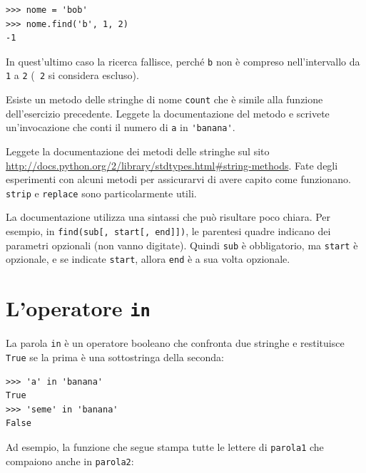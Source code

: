 \documentclass[10pt]{book}
\begin{document}
\begin{verbatim}
>>> nome = 'bob'
>>> nome.find('b', 1, 2)
-1
\end{verbatim}
%
In quest'ultimo caso la ricerca fallisce, perché {\tt b} non è compreso nell'intervallo da {\tt 1} a {\tt 2} ({\tt
2} si considera escluso).

\vspace{0.2in}
\begin{exercise}

Esiste un metodo delle stringhe di nome {\tt count} che è simile alla funzione dell'esercizio precedente. Leggete la documentazione del metodo e scrivete un'invocazione che conti il numero di {\tt a} in \verb"'banana'".
\end{exercise}

\vspace{0.2in}
\begin{exercise}

Leggete la documentazione dei metodi delle stringhe sul sito
\url{http://docs.python.org/2/library/stdtypes.html#string-methods}.
Fate degli esperimenti con alcuni metodi per assicurarvi di avere capito come funzionano. {\tt strip} e {\tt replace} sono particolarmente utili.

La documentazione utilizza una sintassi che può risultare poco chiara. Per esempio, in \verb"find(sub[, start[, end]])", le parentesi quadre indicano dei parametri opzionali (non vanno digitate). Quindi {\tt sub} è obbligatorio, ma
{\tt start} è opzionale, e se indicate {\tt start}, allora {\tt end} è a sua volta opzionale.
\end{exercise}


\section{L'operatore {\tt in}}
\label{inboth}

La parola {\tt in} è un operatore booleano che confronta due stringhe e restituisce {\tt True} se la prima è una sottostringa della seconda:

\begin{verbatim}
>>> 'a' in 'banana'
True
>>> 'seme' in 'banana'
False
\end{verbatim}
%
Ad esempio, la funzione che segue stampa tutte le lettere di {\tt parola1} che compaiono anche in {\tt parola2}:
\end{document}
